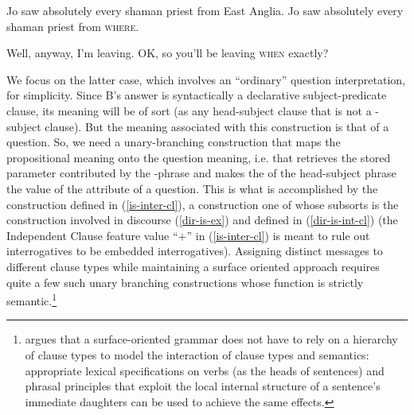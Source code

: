 \documentclass[output=paper]{langsci/langscibook}
\begin{document}
\begin{exe}
\ex\label{rep-is-ex}
\begin{xlist}
Jo saw absolutely every shaman priest from East Anglia.
 Jo saw absolutely every shaman priest from \textsc{where}.
\end{xlist}
\ex\label{dir-is-ex}
\begin{xlist}
 Well, anyway, I'm leaving.
 OK, so you'll be leaving \textsc{when} exactly?
\end{xlist}
\end{exe}

We focus on the latter case, which involves an ``ordinary'' question interpretation, for simplicity. Since B's answer is syntactically a declarative subject-predicate clause, its meaning will be of sort  (as any head-subject clause that is not a -subject clause). But the meaning associated with this construction is that of a question. So, we need a unary-branching construction that maps the propositional meaning onto the question meaning, i.e. that retrieves the stored parameter contributed by the -phrase and makes the  of the head-subject phrase the value of the  attribute of a question. This is what is accomplished by the  construction defined in (\ref{is-inter-cl}), a construction one of whose subsorts is the construction involved in discourse (\ref{dir-is-ex}) and defined in (\ref{dir-is-int-cl}) (the Independent Clause feature value ``$+$'' in (\ref{is-inter-cl}) is meant to rule out 
 interrogatives to be embedded interrogatives). Assigning distinct messages to different clause types while maintaining a surface oriented approach requires quite a few such unary branching constructions whose function is strictly semantic.\footnote{\citet{MuellerSatztypen} argues that a surface-oriented grammar does not have to rely on a hierarchy of clause types to model the interaction of clause types and semantics: appropriate lexical specifications on verbs (as the heads of sentences) and phrasal principles that exploit the local internal structure of a sentence's immediate daughters can be used to achieve the same effects.}
\end{document}

